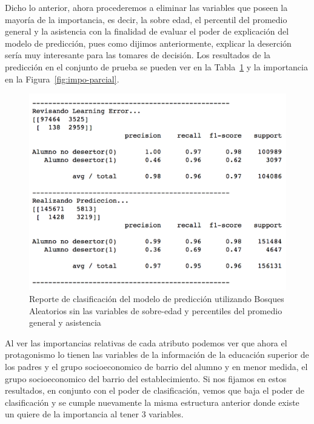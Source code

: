 Dicho lo anterior, ahora procederemos a eliminar las variables que poseen la mayoría de la importancia, es decir, la sobre edad, el percentil del promedio general y la asistencia con la finalidad de evaluar el poder de explicación del modelo de predicción, pues como dijimos anteriormente, explicar la deserción sería muy interesante para las tomares de decisión. Los resultados de la predicción en el conjunto de prueba se pueden ver en la Tabla~\ref{fig:clas-parcial} y la importancia en la Figura~\ref{fig:impo-parcial}.
\begin{figure}[H]
  \centering
    \includegraphics[trim=0cm 0cm 0cm 0cm,scale=0.65]{Figuras/7AnalisisResultado/clas-parcial.png}
      \caption{Reporte de clasificación del modelo de predicción utilizando Bosques Aleatorios sin las variables de sobre-edad y percentiles del promedio general y asistencia}
    \label{fig:clas-parcial}
\end{figure}
Al ver las importancias relativas de cada atributo podemos ver que ahora el protagonismo lo tienen las variables de la información de la educación superior de los padres y el grupo socioeconomico de barrio del alumno y en menor medida, el grupo socioeconomico del barrio del establecimiento. Si nos fijamos en estos resultados, en conjunto con el poder de clasificación, vemos que baja el poder de clasificación y se cumple nuevamente la misma estructura anterior donde existe un quiere de la importancia al tener 3 variables. 
